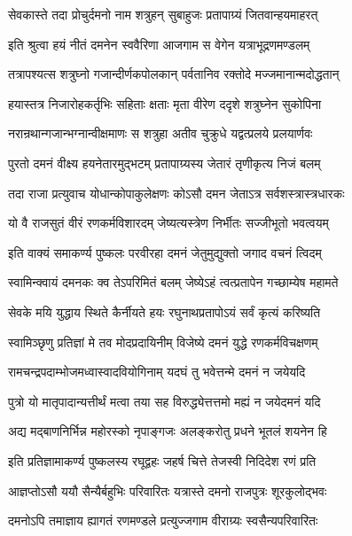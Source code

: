 \twolineshloka
{सेवकास्ते तदा प्रोचुर्दमनो नाम शत्रुहन्}
{सुबाहुजः प्रतापाग्र्यं जितवान्हयमाहरत्}%

\twolineshloka
{इति श्रुत्वा हयं नीतं दमनेन स्ववैरिणा}
{आजगाम स वेगेन यत्राभूद्रणमण्डलम्}%

\twolineshloka
{तत्रापश्यत्स शत्रुघ्नो गजान्दीर्णकपोलकान्}
{पर्वतानिव रक्तोदे मज्जमानान्मदोद्धतान्}%

\twolineshloka
{हयास्तत्र निजारोहकर्तृभिः सहिताः क्षताः}
{मृता वीरेण ददृशे शत्रुघ्नेन सुकोपिना}%

\twolineshloka
{नरान्रथान्गजान्भग्नान्वीक्षमाणः स शत्रुहा}
{अतीव चुक्रुधे यद्वत्प्रलये प्रलयार्णवः}%

\twolineshloka
{पुरतो दमनं वीक्ष्य हयनेतारमुद्भटम्}
{प्रतापाग्र्यस्य जेतारं तृणीकृत्य निजं बलम्}%

\twolineshloka
{तदा राजा प्रत्युवाच योधान्कोपाकुलेक्षणः}
{कोऽसौ दमन जेताऽत्र सर्वशस्त्रास्त्रधारकः}%

\twolineshloka
{यो वै राजसुतं वीरं रणकर्मविशारदम्}
{जेष्यत्यस्त्रेण निर्भीतः सज्जीभूतो भवत्वयम्}%

\twolineshloka
{इति वाक्यं समाकर्ण्य पुष्कलः परवीरहा}
{दमनं जेतुमुद्युक्तो जगाद वचनं त्विदम्}%

\twolineshloka
{स्वामिन्क्वायं दमनकः क्व तेऽपरिमितं बलम्}
{जेष्येऽहं त्वत्प्रतापेन गच्छाम्येष महामते}%

\twolineshloka
{सेवके मयि युद्धाय स्थिते कैर्नीयते हयः}
{रघुनाथप्रतापोऽयं सर्वं कृत्यं करिष्यति}%

\twolineshloka
{स्वामिञ्छृणु प्रतिज्ञां मे तव मोदप्रदायिनीम्}
{विजेष्ये दमनं युद्धे रणकर्मविचक्षणम्}%

\twolineshloka
{रामचन्द्रपदाम्भोजमध्वास्वादवियोगिनाम्}
{यदघं तु भवेत्तन्मे दमनं न जयेयदि}%

\twolineshloka
{पुत्रो यो मातृपादान्यत्तीर्थं मत्वा तया सह}
{विरुद्ध्येत्तत्तमो मह्यं न जयेदमनं यदि}%

\twolineshloka
{अद्य मद्बाणनिर्भिन्न महोरस्को नृपाङ्गजः}
{अलङ्करोतु प्रधने भूतलं शयनेन हि}%


\twolineshloka
{इति प्रतिज्ञामाकर्ण्य पुष्कलस्य रघूद्वहः}
{जहर्ष चित्ते तेजस्वी निदिदेश रणं प्रति}%

\twolineshloka
{आज्ञप्तोऽसौ ययौ सैन्यैर्बहुभिः परिवारितः}
{यत्रास्ते दमनो राजपुत्रः शूरकुलोद्भवः}%

\twolineshloka
{दमनोऽपि तमाज्ञाय ह्यागतं रणमण्डले}
{प्रत्युज्जगाम वीराग्र्यः स्वसैन्यपरिवारितः}%

